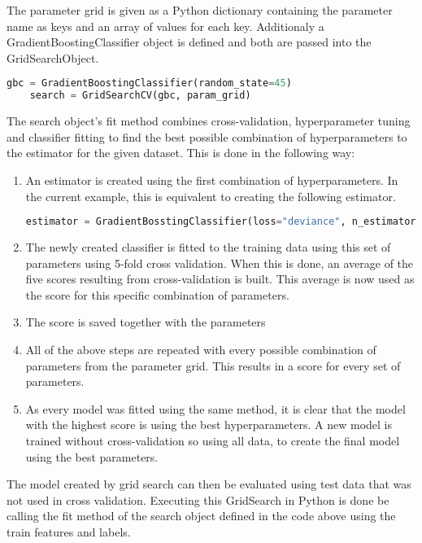 The parameter grid is given as a Python dictionary containing the parameter name as keys and 
an array of values for each key. Additionaly a GradientBoostingClassifier object is defined 
and both are passed into the GridSearchObject.

\begin{lstlisting}[language=Python]
    gbc = GradientBoostingClassifier(random_state=45)    
    search = GridSearchCV(gbc, param_grid)
\end{lstlisting}

The search object's fit method combines cross-validation, hyperparameter tuning and classifier
fitting to find the best possible combination of hyperparameters to the estimator for the given dataset.
This is done in the following way:

\begin{enumerate}
    \item An estimator is created using the first combination of hyperparameters. In the current
    example, this is equivalent to creating the following estimator.
    \begin{lstlisting}[language=Python]
        estimator = GradientBosstingClassifier(loss="deviance", n_estimators=97, learning_rate=0.8, criterion='friedman_mse', min_samples_split=1, min_samples_leaf=1, max_depth=1, random_state=42, max_features=None)
    \end{lstlisting}
    \item The newly created classifier is fitted to the training data using this set of parameters using 5-fold cross validation.
    When this is done, an average of the five scores resulting from cross-validation is built.
    This average is now used as the score for this specific combination of parameters.
    \item The score is saved together with the parameters
    \item All of the above steps are repeated with every possible combination of parameters from the 
    parameter grid. This results in a score for every set of parameters.
    \item As every model was fitted using the same method, it is clear that the model with the highest
    score is using the best hyperparameters. A new model is trained without cross-validation so using all
    data, to create the final model using the best parameters.
\end{enumerate}

The model created by grid search can then be evaluated using test data that was not used in cross validation.
Executing this GridSearch in Python is done be calling the fit method of the search object defined in the code above 
using the train features and labels.


